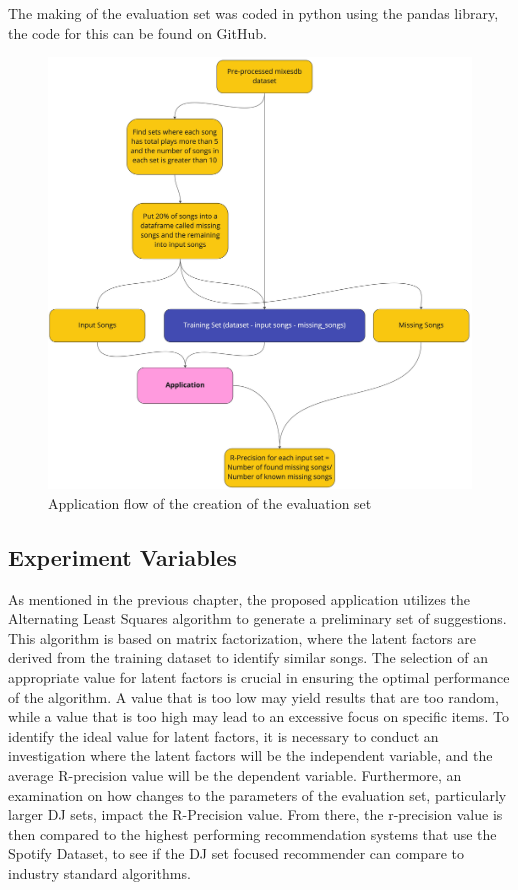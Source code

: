 The making of the evaluation set was coded in python using the pandas library, the code for this can be found on GitHub.

\begin{figure}[H]
	\includegraphics[scale=0.1]{images/evaluation_set_app_flow}
	\centering
	\caption{Application flow of the creation of the evaluation set} 
\end{figure}

\subsection{Experiment Variables}

As mentioned in the previous chapter, the proposed application utilizes the Alternating Least Squares algorithm to generate a preliminary set of suggestions. This algorithm is based on matrix factorization, where the latent factors are derived from the training dataset to identify similar songs. The selection of an appropriate value for latent factors is crucial in ensuring the optimal performance of the algorithm. A value that is too low may yield results that are too random, while a value that is too high may lead to an excessive focus on specific items. To identify the ideal value for latent factors, it is necessary to conduct an  investigation where the latent factors will be the independent variable, and the average R-precision value will be the dependent variable. Furthermore, an examination on how changes to the parameters of the evaluation set, particularly larger DJ sets, impact the R-Precision value. From there, the r-precision value  is then compared to the highest performing recommendation systems that use the Spotify Dataset, to see if the DJ set focused recommender can compare to industry standard algorithms.

